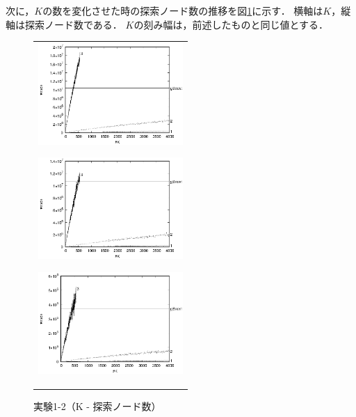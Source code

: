 次に，$K$の数を変化させた時の探索ノード数の推移を図\ref{1-2}に示す．
横軸は$K$，縦軸は探索ノード数である．
$K$の刻み幅は，前述したものと同じ値とする．
\begin{figure}[t]
	\begin{center}
		\begin{tabular}{c}
			\begin{minipage}{0.33\hsize}
				\begin{center}
					\includegraphics[width=55mm]{cpdb/node_1.eps}
				\end{center}
				\vspace{0.5cm}
				\subcaption{$\nu = 0.1$}
				\label{fig:4}
			\end{minipage}
			\begin{minipage}{0.33\hsize}
				\begin{center}
					\includegraphics[width=55mm]{cpdb/node_3.eps}
				\end{center}
				\vspace{0.5cm}
				\subcaption{$\nu = 0.3$}
				\label{fig:5}
			\end{minipage}
			\begin{minipage}{0.33\hsize}
				\begin{center}
					\includegraphics[width=55mm]{cpdb/node_5.eps}
				\end{center}
				\vspace{0.5cm}
				\subcaption{$\nu = 0.5$}
				\label{fig:6}
			\end{minipage}
		\end{tabular}
		\caption{実験1-2（K - 探索ノード数）}
		\label{1-2}
	\end{center}
\end{figure}

